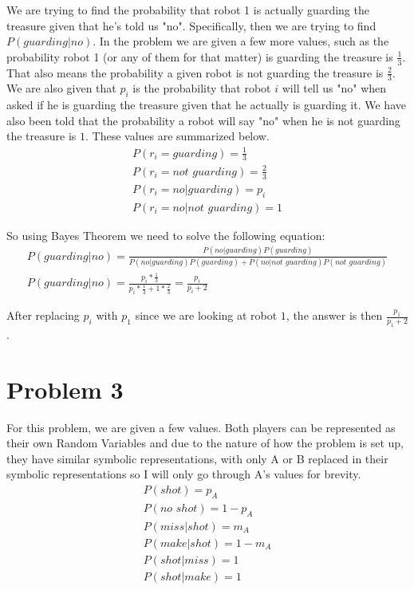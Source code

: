 \documentclass[12pt]{article}
\begin{document}
We are trying to find the probability that robot 1 is actually guarding the treasure given that he's told us "no". Specifically, then we are trying to find $P(guarding | no)$.
In the problem we are given a few more values, such as the probability robot 1 (or any of them for that matter) is guarding the treasure is $\frac{1}{3}$. That also means the probability a given robot is not guarding the treasure is $\frac{2}{3}$.
We are also given that $p_i$ is the probability that robot $i$ will tell us "no" when asked if he is guarding the treasure given that he actually is guarding it.
We have also been told that the probability a robot will say "no" when he is not guarding the treasure is $1$.
These values are summarized below.
\begin{gather*}
  P(r_i = guarding) = \frac{1}{3}        \\
  P(r_i = not\,\,guarding) = \frac{2}{3} \\
  P(r_i = no | guarding) = p_i           \\
  P(r_i = no | not\,\,guarding) = 1
\end{gather*}

So using Bayes Theorem we need to solve the following equation:
\begin{gather*}
  P(guarding | no) = \frac{P(no | guarding)P(guarding)}{P(no | guarding)P(guarding) + P(no | not\,\,guarding)P(not\,\,guarding)} \\
  P(guarding | no) = \frac{p_i * \frac{1}{3}}{p_i * \frac{1}{3} + 1 * \frac{2}{3}} = \frac{p_i}{p_i + 2}
\end{gather*}

After replacing $p_i$ with $p_1$ since we are looking at robot $1$, the answer is then $\frac{p_1}{p_1 + 2}$.

\section{Problem 3}

For this problem, we are given a few values.
Both players can be represented as their own Random Variables and due to the nature of how the problem is set up, they have similar symbolic representations, with only A or B replaced in their symbolic representations so I will only go through A's values for brevity.
\begin{gather*}
  P(shot) = p_A            \\
  P(no\,\,shot) = 1 - p_A  \\
  P(miss | shot) = m_A     \\
  P(make | shot) = 1 - m_A \\
  P(shot | miss) = 1       \\
  P(shot | make) = 1
\end{gather*}
\end{document}
